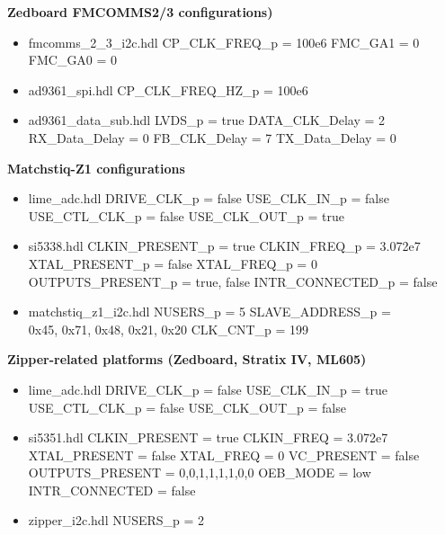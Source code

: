 \begin{appendices}
\begin{minipage}[t]{.5\textwidth}
	\textbf{Zedboard FMCOMMS2/3 configurations)}
	\begin{itemize}
		\item fmcomms\_2\_3\_i2c.hdl
			\subitem CP\_CLK\_FREQ\_p = 100e6
			\subitem FMC\_GA1 = 0
			\subitem FMC\_GA0 = 0
		\item ad9361\_spi.hdl
			\subitem CP\_CLK\_FREQ\_HZ\_p = 100e6
		\item ad9361\_data\_sub.hdl
			\subitem LVDS\_p = true
			\subitem DATA\_CLK\_Delay = 2
			\subitem RX\_Data\_Delay = 0
			\subitem FB\_CLK\_Delay = 7
			\subitem TX\_Data\_Delay = 0
	\end{itemize}
\end{minipage}
	\begin{minipage}[t]{.5\textwidth}
		\textbf{Matchstiq-Z1 configurations}
	\begin{itemize}
		\item lime\_adc.hdl
			\subitem DRIVE\_CLK\_p = false
			\subitem USE\_CLK\_IN\_p = false
			\subitem USE\_CTL\_CLK\_p = false
			\subitem USE\_CLK\_OUT\_p = true
		\item si5338.hdl
			\subitem CLKIN\_PRESENT\_p = true
			\subitem CLKIN\_FREQ\_p = 3.072e7
			\subitem XTAL\_PRESENT\_p = false
			\subitem XTAL\_FREQ\_p = 0
			\subitem OUTPUTS\_PRESENT\_p = true, false
			\subitem INTR\_CONNECTED\_p = false
		\item matchstiq\_z1\_i2c.hdl
			\subitem NUSERS\_p = 5
			\subitem SLAVE\_ADDRESS\_p = \\0x45, 0x71, 0x48, 0x21, 0x20
			\subitem CLK\_CNT\_p = 199
	\end{itemize}
		\textbf{Zipper-related platforms (Zedboard, Stratix IV, ML605)}
	\begin{itemize}
		\item lime\_adc.hdl
			\subitem DRIVE\_CLK\_p = false
			\subitem USE\_CLK\_IN\_p = true
			\subitem USE\_CTL\_CLK\_p = false
			\subitem USE\_CLK\_OUT\_p = false
		\item si5351.hdl
			\subitem CLKIN\_PRESENT = true
			\subitem CLKIN\_FREQ = 3.072e7
			\subitem XTAL\_PRESENT = false
			\subitem XTAL\_FREQ = 0
			\subitem VC\_PRESENT = false
			\subitem OUTPUTS\_PRESENT = 0,0,1,1,1,1,0,0
			\subitem OEB\_MODE = low
			\subitem INTR\_CONNECTED = false
		\item zipper\_i2c.hdl
			\subitem NUSERS\_p = 2
	\end{itemize}
	\end{minipage}


\end{appendices}
